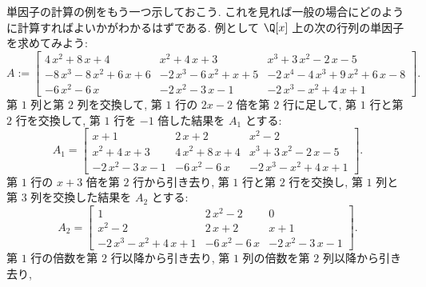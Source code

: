 \documentclass[12pt,twoside]{jarticle}
\begin{document}

\begin{example}
\label{example:elem-div-2}
  単因子の計算の例をもう一つ示しておこう.
  これを見れば一般の場合にどのように計算すればよいかがわかるはずである.
  例として $\Q[x]$ 上の次の行列の単因子を求めてみよう:
  \begin{equation*}
    A :=  \left[ 
      \begin{array}{ccc}
        4\,{x}^{2} + 8\,{x} + 4 & {x}^{2} + 4\,{x} + 3 & {x}^{3} + 3\,{x}
        ^{2} - 2\,{x} - 5 \\
        - 8\,{x}^{3} - 8\,{x}^{2} + 6\,{x} + 6 &  - 2\,{x}^{3} - 6\,{x}
        ^{2} + {x} + 5 &  - 2\,{x}^{4} - 4\,{x}^{3} + 9\,{x}^{2} + 6\,{x}
        - 8 \\
        - 6\,{x}^{2} - 6\,{x} &  - 2\,{x}^{2} - 3\,{x} - 1 &  - 2\,{x}^{
          3} - {x}^{2} + 4\,{x} + 1
      \end{array}
    \right].
  \end{equation*}
  第 $1$ 列と第 $2$ 列を交換して, 
  第 $1$ 行の $2x-2$ 倍を第 $2$ 行に足して,
  第 $1$ 行と第 $2$ 行を交換して,
  第 $1$ 行を $-1$ 倍した結果を $A_1$ とする:
  \begin{equation*}
    A_1 =  \left[ 
      \begin{array}{ccc}
        {x} + 1 & 2\,{x} + 2 & {x}^{2} - 2 \\
        {x}^{2} + 4\,{x} + 3 & 4\,{x}^{2} + 8\,{x} + 4 & {x}^{3} + 3\,{x}
        ^{2} - 2\,{x} - 5 \\
        - 2\,{x}^{2} - 3\,{x} - 1 &  - 6\,{x}^{2} - 6\,{x} &  - 2\,{x}^{
          3} - {x}^{2} + 4\,{x} + 1
      \end{array}
    \right].
  \end{equation*}
  第 $1$ 行の $x+3$ 倍を第 $2$ 行から引き去り,
  第 $1$ 行と第 $2$ 行を交換し,
  第 $1$ 列と第 $3$ 列を交換した結果を $A_2$ とする:
  \begin{equation*}
    A_2 =  \left[ 
      \begin{array}{ccc}
        1 & 2\,{x}^{2} - 2 & 0 \\
        {x}^{2} - 2 & 2\,{x} + 2 & {x} + 1 \\
        - 2\,{x}^{3} - {x}^{2} + 4\,{x} + 1 &  - 6\,{x}^{2} - 6\,{x} & 
        - 2\,{x}^{2} - 3\,{x} - 1
      \end{array}
    \right].
  \end{equation*}
  第 $1$ 行の倍数を第 $2$ 行以降から引き去り,
  第 $1$ 列の倍数を第 $2$ 列以降から引き去り,

\end{example}
\end{document}
